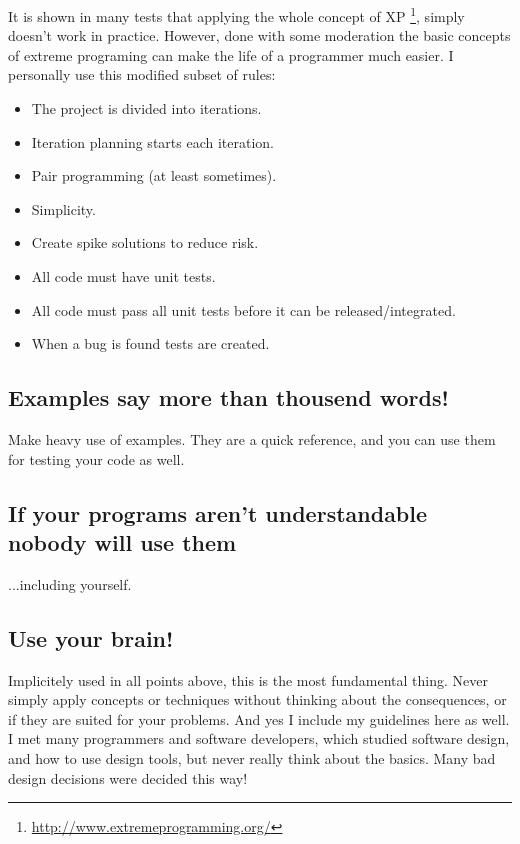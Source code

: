 \documentclass[letterpaper,10pt,english]{manual}
\begin{document}
It is shown in many tests that applying the whole concept of XP \footnote{
\href{http://www.extremeprogramming.org/}{http://www.extremeprogramming.org/}
}, simply
doesn't work in practice.
However, done with some moderation the basic concepts of extreme programing can make
the life of a programmer much easier. I personally use this modified subset of rules:
\begin{itemize}
\item {} 
The project is divided into iterations.

\item {} 
Iteration planning starts each iteration.

\item {} 
Pair programming (at least sometimes).

\item {} 
Simplicity.

\item {} 
Create spike solutions to reduce risk.

\item {} 
All code must have unit tests.

\item {} 
All code must pass all unit tests before it  can be released/integrated.

\item {} 
When a bug is found tests are created.

\end{itemize}


\subsection{Examples say more than thousend words!}

Make heavy use of examples. They are a quick reference, and you
can use them for testing your code as well.


\subsection{If your programs aren't understandable nobody will use them}

...including yourself.


\subsection{Use your brain!}

Implicitely used in all points above, this is the most fundamental thing.
Never simply apply concepts or techniques without thinking about the consequences,
or if they are suited for your problems. And yes I include my guidelines here as well.
I met many programmers and software developers, which studied software design, and
how to use design tools, but never really think about the basics. Many bad design decisions
were decided this way!
\end{document}
